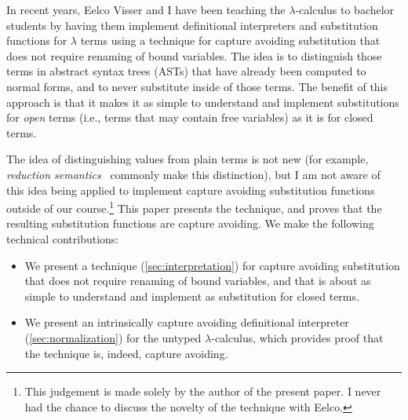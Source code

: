 In recent years, Eelco Visser and I have been teaching the $\lambda$-calculus to bachelor students by having them implement definitional interpreters and substitution functions for $\lambda$ terms using a technique for capture avoiding substitution that does not require renaming of bound variables.
The idea is to distinguish those terms in abstract syntax trees (ASTs) that have already been computed to normal forms, and to never substitute inside of those terms.
The benefit of this approach is that it makes it as simple to understand and implement substitutions for \emph{open} terms (i.e., terms that may contain free variables) as it is for closed terms.

The idea of distinguishing values from plain terms is not new (for example, \emph{reduction semantics}~\citep{FelleisenH92} commonly make this distinction), but I am not aware of this idea being applied to implement capture avoiding substitution functions outside of our course.\footnote{This judgement is made solely by the author of the present paper. I never had the chance to discuss the novelty of the technique with Eelco.}
This paper presents the technique, and proves that the resulting substitution functions are capture avoiding.
We make the following technical contributions:

\begin{itemize}
\item We present a technique (\cref{sec:interpretation}) for capture avoiding substitution that does not require renaming of bound variables, and that is about as simple to understand and implement as substitution for closed terms.
\item We present an intrinsically capture avoiding definitional interpreter (\cref{sec:normalization}) for the untyped $\lambda$-calculus, which provides proof that the technique is, indeed, capture avoiding.
\end{itemize}





